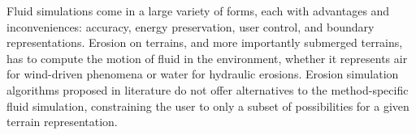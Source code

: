 \midConclusion




Fluid simulations come in a large variety of forms, each with advantages and inconveniences: accuracy, energy preservation, user control, and boundary representations. Erosion on terrains, and more importantly submerged terrains, has to compute the motion of fluid in the environment, whether it represents air for wind-driven phenomena or water for hydraulic erosions. Erosion simulation algorithms proposed in literature do not offer alternatives to the method-specific fluid simulation, constraining the user to only a subset of possibilities for a given terrain representation.

